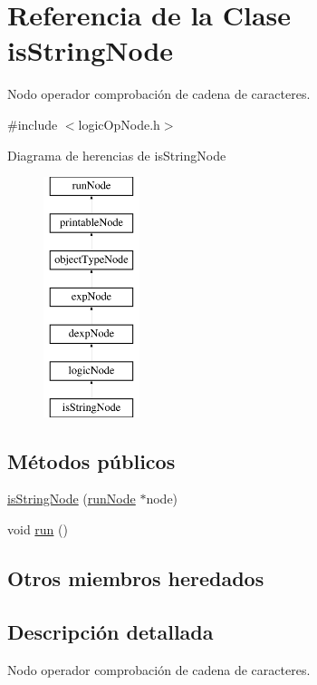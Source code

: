 \hypertarget{classisStringNode}{\section{Referencia de la Clase is\-String\-Node}
\label{classisStringNode}
}


Nodo operador comprobación de cadena de caracteres.  




{\ttfamily \#include $<$logic\-Op\-Node.\-h$>$}

Diagrama de herencias de is\-String\-Node\begin{figure}[H]
\begin{center}
\leavevmode
\includegraphics[height=7.000000cm]{classisStringNode}
\end{center}
\end{figure}
\subsection*{Métodos públicos}
\begin{DoxyCompactItemize}
\item 
\hyperlink{classisStringNode_a12b137c774428ab645b7fe0b44daf64a}{is\-String\-Node} (\hyperlink{classrunNode}{run\-Node} $\ast$node)
\item 
void \hyperlink{classisStringNode_a38366ff46223286f941e8d471b56a74c}{run} ()
\end{DoxyCompactItemize}
\subsection*{Otros miembros heredados}


\subsection{Descripción detallada}
Nodo operador comprobación de cadena de caracteres. 

